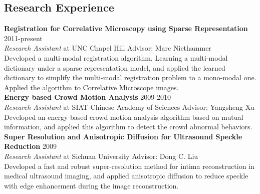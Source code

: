 \documentclass[line,margin]{res}
\begin{document}
\begin{resume}
\section{\sc Research Experience} 
\smallskip

\textbf{Registration for Correlative Microscopy using Sparse Representation} \hfill      2011-present \\
\textit{ Research Assistant} at UNC Chapel Hill  \hfill {Advisor: Marc Niethammer}\\
Developed a multi-modal registration algorithm. Learning a multi-modal dictionary under a sparse representation model, and applied the learned dictionary to simplify the multi-modal registration problem to a mono-modal one. Applied the algorithm to Correlative Microscope images.\vspace{.05in}
\\ %
\textbf{Energy based Crowd Motion Analysis} \hfill      2009-2010 \\
\textit{Research Assistant} at SIAT-Chinese Academy of Sciences \hfill {Advisor: Yangsheng Xu}\\
Developed an energy based crowd motion analysis algorithm based on mutual information, and
applied this algorithm to detect the crowd abnormal behaviors.\vspace{.05in}
\\ %
\textbf{Super Resolution and Anisotropic Diffusion for Ultrasound Speckle Reduction} \hfill      2009 \\
\textit{Research Assistant} at Sichuan University \hfill {Advisor: Dong C. Liu}\\
Developed a fast and robust super-resolution method for intima reconstruction in medical
ultrasound imaging, and applied anisotropic diffusion to reduce speckle with edge enhancement during the image reconstruction. \vspace{.05in} %


\end{resume}
\end{document}
